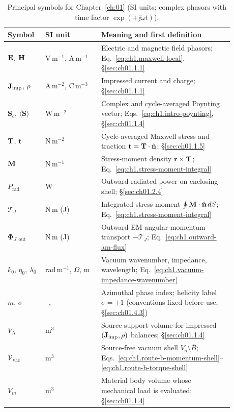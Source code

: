 \begin{table}[t]
\centering
\caption{Principal symbols for Chapter~\ref{ch:01} (SI units; complex phasors with time factor $\exp(+\jj\omega t)$).}
\label{tab:ch1.principal-symbols}
\renewcommand{\arraystretch}{1.15}
\begin{tabular}{@{}p{0.14\linewidth}p{0.22\linewidth}p{0.52\linewidth}@{}}
\hline
Symbol & SI unit & Meaning and first definition \\
\hline
$\mathbf{E}$, $\mathbf{H}$ & V\,m$^{-1}$, A\,m$^{-1}$ & Electric and magnetic field phasors; Eq.~\eqref{eq:ch1.maxwell-local}, \S\ref{sec:ch01.1.1} \\
$\mathbf{J}_{\mathrm{imp}}$, $\rho$ & A\,m$^{-2}$, C\,m$^{-3}$ & Impressed current and charge; \S\ref{sec:ch01.1.1} \\
$\mathbf{S}_\mathrm{c}$, $\langle\mathbf{S}\rangle$ & W\,m$^{-2}$ & Complex and cycle-averaged Poynting vector; Eqs.~\eqref{eq:ch1.intro-poynting}, \S\ref{sec:ch01.1.4} \\
$\mathbf{T}$, $\mathbf{t}$ & N\,m$^{-2}$ & Cycle-averaged Maxwell stress and traction $\mathbf{t}=\mathbf{T}\cdot\hat{\mathbf{n}}$; \S\ref{sec:ch01.1.5} \\
$\mathbf{M}$ & N\,m$^{-1}$ & Stress-moment density $\mathbf{r}\times\mathbf{T}$; Eq.~\eqref{eq:ch1.stress-moment-integral} \\
$P_{\mathrm{rad}}$ & W & Outward radiated power on enclosing shell; \S\ref{sec:ch01.2.4} \\
$\boldsymbol{\mathcal{T}}_J$ & N\,m (J) & Integrated stress moment $\oint \mathbf{M}\cdot\hat{\mathbf{n}}\,dS$; Eq.~\eqref{eq:ch1.stress-moment-integral} \\
$\boldsymbol{\Phi}_{J,\mathrm{out}}$ & N\,m (J) & Outward EM angular-momentum transport $-\boldsymbol{\mathcal{T}}_J$; Eq.~\eqref{eq:ch1.outward-am-flux} \\
$k_0$, $\eta_0$, $\lambda_0$ & rad\,m$^{-1}$, $\Omega$, m & Vacuum wavenumber, impedance, wavelength; Eq.~\eqref{eq:ch1.vacuum-impedance-wavenumber} \\
$m$, $\sigma$ & --, -- & Azimuthal phase index; helicity label $\sigma=\pm1$ (conventions fixed before use, \S\ref{sec:ch01.4.3}) \\
$V_{\mathrm{A}}$ & m$^3$ & Source-support volume for impressed $(\mathbf{J}_{\mathrm{imp}},\rho)$ balances; \S\ref{sec:ch01.1.4} \\
$\mathcal{V}_{\mathrm{vac}}$ & m$^3$ & Source-free vacuum shell $V_o\setminus\overline{B}$; Eqs.~\eqref{eq:ch1.route-b-momentum-shell}--\eqref{eq:ch1.route-b-torque-shell} \\
$V_m$ & m$^3$ & Material body volume whose mechanical load is evaluated; \S\ref{sec:ch01.1.4} \\

\end{tabular}
\end{table}
